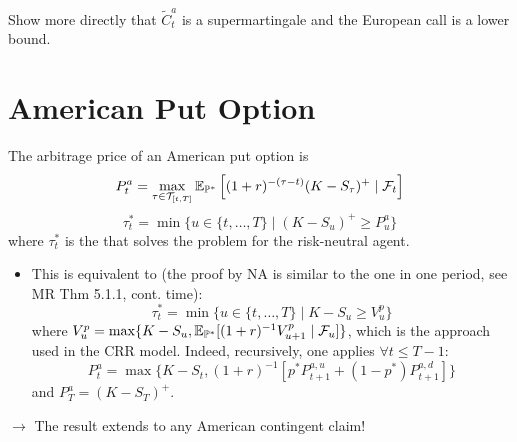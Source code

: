 \begin{homework}
    Show more directly that $\tilde{C}_t^a$ is a supermartingale and the European call is a lower bound.
\end{homework}

\section{American Put Option}

\begin{remark}
    The arbitrage price of an American put option is
    \[ P_t^a = \max_{\tau \in \mathcal{T}_{[t,T]}} \mathbb E_{\mathbb P^*} \left[ (1+r)^{-(\tau-t)} (K - S_\tau)^+ \mid \mathcal{F}_t \right] \]
    \[ \tau_t^* = \min \{ u \in \{t, \dots, T\} \mid (K - S_u)^+ \geq P_u^a \} \]
    where $\tau_t^*$ is the  that solves the problem for the risk-neutral agent.
    
    \begin{itemize}
        \item This is equivalent to (the proof by NA is similar to the one in one period, see MR Thm 5.1.1, cont. time):
        \[ \tau_t^* = \min \{ u \in \{t, \dots, T\} \mid K - S_u \geq V_u^p \} \]
        where $V_u^p = \max \{ K - S_u, \mathbb E_{\mathbb P^*} [(1+r)^{-1} V_{u+1}^p \mid \mathcal{F}_u] \}$, which is the approach used in the CRR model. Indeed, recursively, one applies $\forall t \leq T-1$:
        \[ P_t^a = \max \{ K - S_t, (1+r)^{-1} [p^* P_{t+1}^{a,u} + (1-p^*) P_{t+1}^{a,d}] \} \]
        and $P_T^a = (K - S_T)^+$.
    \end{itemize}

    \begin{center}
    \end{center}

    $\to$ The result extends to any American contingent claim!
\end{remark}

